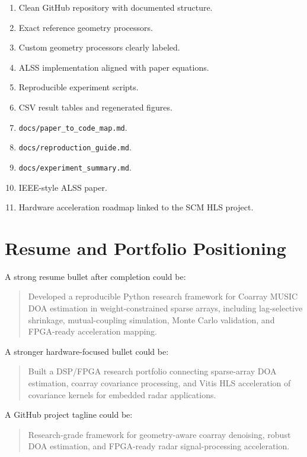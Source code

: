 \documentclass[11pt,letterpaper]{article}
\newcommand{\codepath}[1]{\texttt{#1}}
\begin{document}
\begin{enumerate}[leftmargin=*]
    \item Clean GitHub repository with documented structure.
    \item Exact reference geometry processors.
    \item Custom geometry processors clearly labeled.
    \item ALSS implementation aligned with paper equations.
    \item Reproducible experiment scripts.
    \item CSV result tables and regenerated figures.
    \item \codepath{docs/paper\_to\_code\_map.md}.
    \item \codepath{docs/reproduction\_guide.md}.
    \item \codepath{docs/experiment\_summary.md}.
    \item IEEE-style ALSS paper.
    \item Hardware acceleration roadmap linked to the SCM HLS project.
\end{enumerate}

\section{Resume and Portfolio Positioning}

A strong resume bullet after completion could be:

\begin{quote}
Developed a reproducible Python research framework for Coarray MUSIC DOA estimation in weight-constrained sparse arrays, including lag-selective shrinkage, mutual-coupling simulation, Monte Carlo validation, and FPGA-ready acceleration mapping.
\end{quote}

A stronger hardware-focused bullet could be:

\begin{quote}
Built a DSP/FPGA research portfolio connecting sparse-array DOA estimation, coarray covariance processing, and Vitis HLS acceleration of covariance kernels for embedded radar applications.
\end{quote}

A GitHub project tagline could be:

\begin{quote}
Research-grade framework for geometry-aware coarray denoising, robust DOA estimation, and FPGA-ready radar signal-processing acceleration.
\end{quote}
\end{document}
